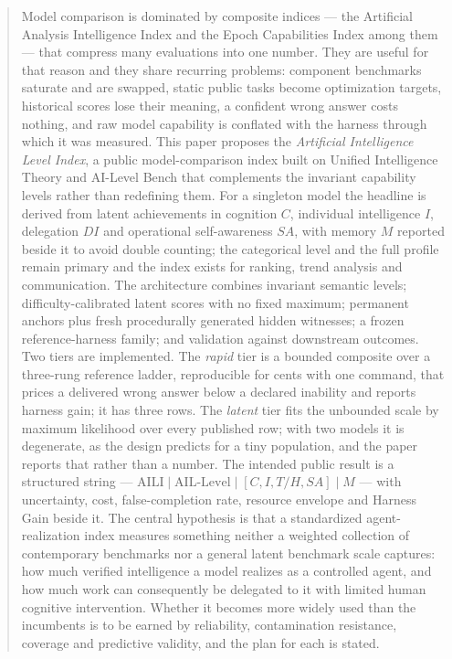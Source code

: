 \begin{abstract}
Model comparison is dominated by composite indices --- the Artificial Analysis Intelligence Index and the Epoch Capabilities Index among them --- that compress many evaluations into one number. They are useful for that reason and they share recurring problems: component benchmarks saturate and are swapped, static public tasks become optimization targets, historical scores lose their meaning, a confident wrong answer costs nothing, and raw model capability is conflated with the harness through which it was measured. This paper proposes the \emph{Artificial Intelligence Level Index}, a public model-comparison index built on Unified Intelligence Theory and AI-Level Bench that complements the invariant capability levels rather than redefining them. For a singleton model the headline is derived from latent achievements in cognition $C$, individual intelligence $I$, delegation $DI$ and operational self-awareness $SA$, with memory $M$ reported beside it to avoid double counting; the categorical level and the full profile remain primary and the index exists for ranking, trend analysis and communication. The architecture combines invariant semantic levels; difficulty-calibrated latent scores with no fixed maximum; permanent anchors plus fresh procedurally generated hidden witnesses; a frozen reference-harness family; and validation against downstream outcomes. Two tiers are implemented. The \emph{rapid} tier is a bounded composite over a three-rung reference ladder, reproducible for cents with one command, that prices a delivered wrong answer below a declared inability and reports harness gain; it has three rows. The \emph{latent} tier fits the unbounded scale by maximum likelihood over every published row; with two models it is degenerate, as the design predicts for a tiny population, and the paper reports that rather than a number. The intended public result is a structured string --- $\mathrm{AILI} \mid \text{AIL-Level} \mid [C, I, T/H, SA] \mid M$ --- with uncertainty, cost, false-completion rate, resource envelope and Harness Gain beside it. The central hypothesis is that a standardized agent-realization index measures something neither a weighted collection of contemporary benchmarks nor a general latent benchmark scale captures: how much verified intelligence a model realizes as a controlled agent, and how much work can consequently be delegated to it with limited human cognitive intervention. Whether it becomes more widely used than the incumbents is to be earned by reliability, contamination resistance, coverage and predictive validity, and the plan for each is stated.
\end{abstract}

